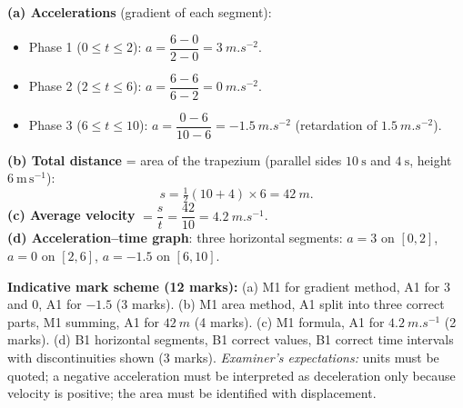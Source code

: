 \documentclass[11pt]{article}
\begin{document}
\begin{corrige}
\textbf{(a) Accelerations} (gradient of each segment):
\begin{itemize}
\item Phase 1 ($0\le t\le 2$): $a = \dfrac{6-0}{2-0} = \SI{3}{m.s^{-2}}$.
\item Phase 2 ($2\le t\le 6$): $a = \dfrac{6-6}{6-2} = \SI{0}{m.s^{-2}}$.
\item Phase 3 ($6\le t\le 10$): $a = \dfrac{0-6}{10-6} = \SI{-1.5}{m.s^{-2}}$ (retardation of $\SI{1.5}{m.s^{-2}}$).
\end{itemize}
\textbf{(b) Total distance} = area of the trapezium (parallel sides $10\ \mathrm{s}$ and $4\ \mathrm{s}$, height $6\ \mathrm{m\,s^{-1}}$):
\[
s = \tfrac12(10+4)\times 6 = \SI{42}{m}.
\]
\textbf{(c) Average velocity} $= \dfrac{s}{t} = \dfrac{42}{10} = \SI{4.2}{m.s^{-1}}$.\\[2pt]
\textbf{(d) Acceleration–time graph}: three horizontal segments: $a=3$ on $[0,2]$, $a=0$ on $[2,6]$, $a=-1.5$ on $[6,10]$.
\begin{center}
\end{center}
\textbf{Indicative mark scheme (12 marks):} (a) M1 for gradient method, A1 for $3$ and $0$, A1 for $-1.5$ (3 marks). (b) M1 area method, A1 split into three correct parts, M1 summing, A1 for $\SI{42}{m}$ (4 marks). (c) M1 formula, A1 for $\SI{4.2}{m.s^{-1}}$ (2 marks). (d) B1 horizontal segments, B1 correct values, B1 correct time intervals with discontinuities shown (3 marks). \emph{Examiner's expectations:} units must be quoted; a negative acceleration must be interpreted as deceleration only because velocity is positive; the area must be identified with displacement.
\end{corrige}
\end{document}
